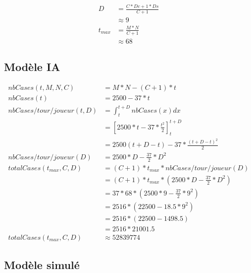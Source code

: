 		
		\begin{align}
		D &= \frac{C*Dc+1*Ds}{C+1}\\
		&\approx 9 \\
		t_{max} &= \frac{M*N}{C+1}\\
		& \approx 68
		\end{align}
		
		\subsection{Modèle IA}
		
		
		
		\begin{align}
			nbCases(t, M, N, C) &= M*N-(C+1)*t\\
			nbCases(t) & = 2500 - 37 * t\\
			nbCases/tour/joueur(t, D) &= \int_{t}^{t+D} nbCases(x) dx\\
			&= [2500*t - 37*\frac{t^2}{2}]_{t}^{t+D}\\
			& = 2500(t+D-t) - 37*\frac{(t+D-t)^2}{2}\\
			nbCases/tour/joueur(D)& = 2500*D - \frac{37}{2}*D^2\\
			totalCases(t_{max}, C, D) &= (C+1)*t_{max}*nbCases/tour/joueur(D)\\
			&= (C+1)*t_{max}*(2500*D - \frac{37}{2}*D^2)\\
			&= 37*68 *(2500*9 - \frac{37}{2}*9^2)\\
			&= 2516 * (22500 - 18.5*9^2)\\
			&= 2516 * (22500 - 1498.5)\\
			&= 2516 * 21001.5\\
			totalCases(t_{max}, C, D) &\approx 52839774
		\end{align}
		
		\subsection{Modèle simulé}
		
